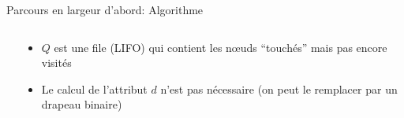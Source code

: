 \begin{frame}{Parcours en largeur d'abord: Algorithme}

\begin{columns}
\begin{column}{6cm}
\begin{center}
{\small
{}
}
\end{center}
\end{column}
\begin{column}{5cm}
\begin{itemize}
\item $Q$ est une file (LIFO) qui contient les n\oe uds ``touchés'' mais pas encore visités
\item Le calcul de l'attribut $d$ n'est pas nécessaire (on peut le
  remplacer par un drapeau binaire)
\end{itemize}
\end{column}
\end{columns}

\end{frame}


